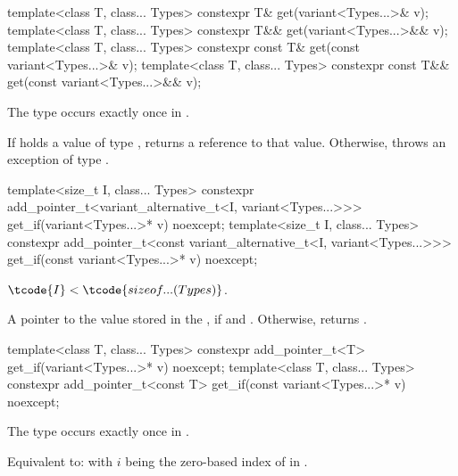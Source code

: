 %
\begin{itemdecl}
template<class T, class... Types> constexpr T& get(variant<Types...>& v);
template<class T, class... Types> constexpr T&& get(variant<Types...>&& v);
template<class T, class... Types> constexpr const T& get(const variant<Types...>& v);
template<class T, class... Types> constexpr const T&& get(const variant<Types...>&& v);
\end{itemdecl}

\begin{itemdescr}
\pnum
\mandates
The type  occurs exactly once in .

\pnum
\effects
If  holds a value of type , returns a reference to that value.
Otherwise, throws an exception of type .
\end{itemdescr}

%
%
\begin{itemdecl}
template<size_t I, class... Types>
  constexpr add_pointer_t<variant_alternative_t<I, variant<Types...>>>
    get_if(variant<Types...>* v) noexcept;
template<size_t I, class... Types>
  constexpr add_pointer_t<const variant_alternative_t<I, variant<Types...>>>
    get_if(const variant<Types...>* v) noexcept;
\end{itemdecl}

\begin{itemdescr}
\pnum
\mandates
$\tcode{I} < \tcode{sizeof...(Types)}$.

\pnum
\returns
A pointer to the value stored in the , if 
and . Otherwise, returns .
\end{itemdescr}

%
%
\begin{itemdecl}
template<class T, class... Types>
  constexpr add_pointer_t<T>
    get_if(variant<Types...>* v) noexcept;
template<class T, class... Types>
  constexpr add_pointer_t<const T>
    get_if(const variant<Types...>* v) noexcept;
\end{itemdecl}

\begin{itemdescr}
\pnum
\mandates
The type  occurs exactly once in .

\pnum
\effects
Equivalent to:  with $i$ being the zero-based
index of  in .
\end{itemdescr}

